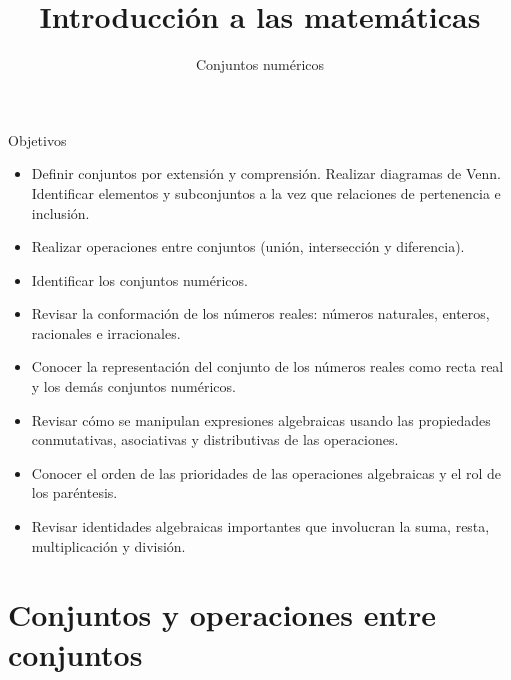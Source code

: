 \documentclass[9pt, aspectratio=169]{beamer}
\title{Introducción a las matemáticas}
\subtitle{Conjuntos numéricos}
\begin{document}
\maketitle

\begin{frame}{ Objetivos }
\begin{multicols}{2}
\begin{itemize}
    \item Definir conjuntos por extensión y comprensión. Realizar diagramas de Venn. Identificar elementos y subconjuntos a la vez que relaciones de pertenencia e inclusión.
    \item Realizar operaciones entre conjuntos (unión, intersección y diferencia).
    \item Identificar los conjuntos numéricos.
    \item Revisar la conformación de los números reales: números naturales, enteros, racionales e irracionales.
    \item Conocer la representación del conjunto de los números reales como recta real y los demás conjuntos numéricos.
\item Revisar cómo se manipulan expresiones algebraicas usando las propiedades conmutativas, asociativas y distributivas de las operaciones.
\item Conocer el orden de las prioridades de las operaciones algebraicas y el rol de los paréntesis.
\item Revisar identidades algebraicas importantes que involucran la suma, resta, multiplicación y división.
\end{itemize}
\end{multicols}
\end{frame}

\section{Conjuntos y operaciones entre conjuntos}
\end{document}
